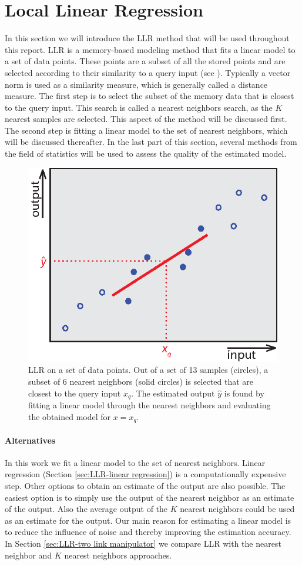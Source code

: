 \section{Local Linear Regression}\label{sec:LLR-local linear regression}
In this section we will introduce the \ac{LLR} method that will be used throughout this report. \ac{LLR} is a memory-based modeling method that fits a linear model to a set of data points. These points are a subset of all the stored points and are selected according to their similarity to a query input (see ). Typically a vector norm is used as a similarity measure, which is generally called a distance measure. The first step is to select the subset of the memory data that is closest to the query input. This search is called a  nearest neighbors search, as the $K$ nearest samples are selected. This aspect of the method will be discussed first. The second step is fitting a linear model to the set of nearest neighbors, which will be discussed thereafter. In the last part of this section, several methods from the field of statistics will be used to assess the quality of the estimated model. 

\begin{figure}[htbp]
	\centering
		\includegraphics[width=.5\textwidth]{img/LLR_schematic2}
	\caption[\acs{LLR} on set of points]{\acs{LLR} on a set of data points. Out of a set of 13 samples (circles), a subset of 6 nearest neighbors (solid circles) is selected that are closest to the query input $x_q$. The estimated output $\hat{y}$ is found by fitting a linear model through the nearest neighbors and evaluating the obtained model for $x=x_q$.}
	\label{fig:LLR-LLRschematic}
\end{figure}

\paragraph{Alternatives} In this work we fit a linear model to the set of nearest neighbors. Linear regression (Section \ref{sec:LLR-linear regression}) is a computationally expensive step. Other options to obtain an estimate of the output are also possible. The easiest option is to simply use the output of the nearest neighbor as an estimate of the output. Also the average output of the $K$ nearest neighbors could be used as an estimate for the output. Our main reason for estimating a linear model is to reduce the influence of noise and thereby improving the estimation accuracy. In Section \ref{sec:LLR-two link manipulator} we compare \ac{LLR} with the nearest neighbor and $K$ nearest neighbors approaches. 

